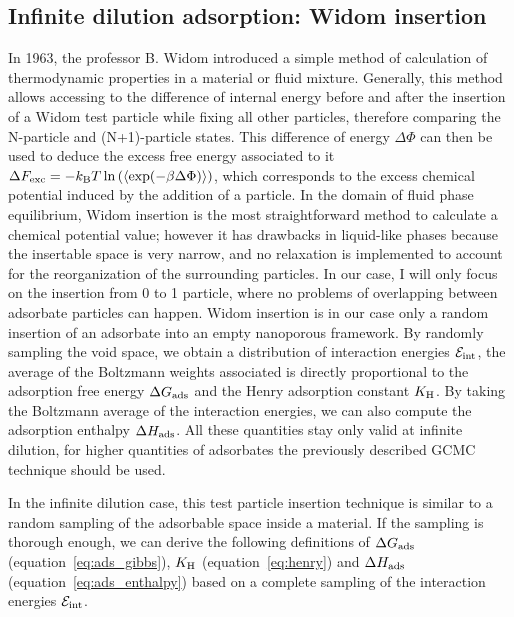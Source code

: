 \documentclass[main.tex]{subfiles}
\begin{document}
\subsection{Infinite dilution adsorption: Widom insertion}\label{sct:widom}

In 1963, the professor B. Widom introduced a simple method of calculation of thermodynamic properties in a material or fluid mixture.\autocite{Widom1963} Generally, this method allows accessing to the difference of internal energy before and after the insertion of a Widom test particle while fixing all other particles, therefore comparing the N-particle and (N+1)-particle states. This difference of energy $\Delta \Phi$ can then be used to deduce the excess free energy associated to it $\Delta F_{\text{exc}} = -k_{\text{B}} T \ln\left(\langle \exp(- \beta\Delta \Phi) \rangle\right)$, which corresponds to the excess chemical potential induced by the addition of a particle. In the domain of fluid phase equilibrium, Widom insertion is the most straightforward method to calculate a chemical potential value; however it has drawbacks in liquid-like phases because the insertable space is very narrow, and no relaxation is implemented to account for the reorganization of the surrounding particles.\autocite{Nezbeda_1991} In our case, I will only focus on the insertion from 0 to 1 particle, where no problems of overlapping between adsorbate particles can happen. Widom insertion is in our case only a random insertion of an adsorbate into an empty nanoporous framework. By randomly sampling the void space, we obtain a distribution of interaction energies $\mathcal{E}_{\text{int}}$, the average of the Boltzmann weights associated is directly proportional to the adsorption free energy $\Delta G_{\text{ads}}$ and the Henry adsorption constant $K_{\text{H}}$. By taking the Boltzmann average of the interaction energies, we can also compute the adsorption enthalpy $\Delta H_{\text{ads}}$. All these quantities stay only valid at infinite dilution, for higher quantities of adsorbates the previously described GCMC technique should be used.  

In the infinite dilution case, this test particle insertion technique is similar to a random sampling of the adsorbable space inside a material. If the sampling is thorough enough, we can derive the following definitions of $\Delta G_{\text{ads}}$ (equation~\ref{eq:ads_gibbs}), $K_{\text{H}}$ (equation~\ref{eq:henry}) and $\Delta H_{\text{ads}}$ (equation~\ref{eq:ads_enthalpy}) based on a complete sampling of the interaction energies $\mathcal{E}_{\text{int}}$. 
\end{document}
